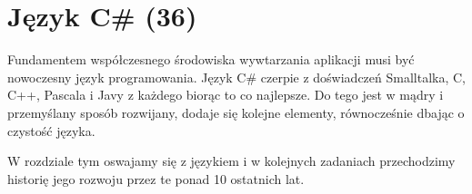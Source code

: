 ﻿\chapter{Język C\# (36)}

Fundamentem współczesnego środowiska wywtarzania aplikacji musi być nowoczesny język programowania. Język C\# czerpie z doświadczeń Smalltalka, C, C++, Pascala i Javy
z każdego biorąc to co najlepsze. Do tego jest w mądry i przemyślany sposób rozwijany, dodaje się kolejne elementy, równocześnie dbając o czystość języka.

W rozdziale tym oswajamy się z językiem i w kolejnych zadaniach przechodzimy historię jego rozwoju przez te ponad 10 ostatnich lat.

 



 
